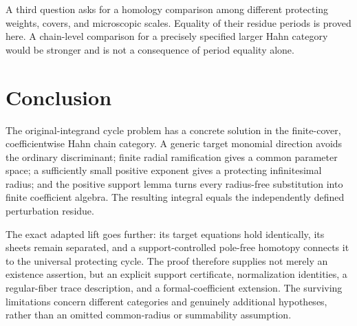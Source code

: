 \documentclass[11pt,letterpaper]{article}
\theoremstyle{definition}
\theoremstyle{remark}
\numberwithin{equation}{section}
\begin{document}
A third question asks for a homology comparison among different protecting
weights, covers, and microscopic scales. Equality of their residue periods
is proved here. A chain-level comparison for a precisely specified larger
Hahn category would be stronger and is not a consequence of period equality
alone.

\section{Conclusion}
The original-integrand cycle problem has a concrete solution in the
finite-cover, coefficientwise Hahn chain category. A generic target monomial
direction avoids the ordinary discriminant; finite radial ramification gives
a common parameter space; a sufficiently small positive exponent gives a
protecting infinitesimal radius; and the positive support lemma turns every
radius-free substitution into finite coefficient algebra. The resulting
integral equals the independently defined perturbation residue.

The exact adapted lift goes further: its target equations hold identically,
its sheets remain separated, and a support-controlled pole-free homotopy
connects it to the universal protecting cycle. The proof therefore supplies
not merely an existence assertion, but an explicit support certificate,
normalization identities, a regular-fiber trace description, and a formal-coefficient extension. The surviving limitations concern different categories
and genuinely additional hypotheses, rather than an omitted common-radius
or summability assumption.
\end{document}
